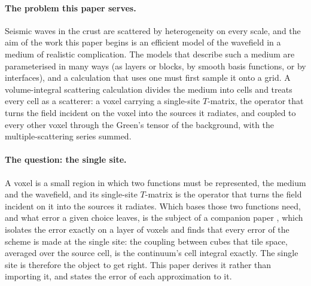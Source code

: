 \documentclass[11pt,a4paper]{article}
\begin{document}
\paragraph{The problem this paper serves.} Seismic waves in the crust are scattered by heterogeneity
on every scale, and the aim of the work this paper begins is an efficient model of the wavefield in a
medium of realistic complication. The models that describe such a medium are parameterised in many
ways (as layers or blocks, by smooth basis functions, or by interfaces), and a calculation that uses
one must first sample it onto a grid. A volume-integral scattering calculation divides the medium into
cells and treats every cell as a scatterer: a voxel carrying a single-site $T$-matrix, the operator
that turns the field incident on the voxel into the sources it radiates, and coupled to every other
voxel through the Green's tensor of the background, with the multiple-scattering series summed.


\paragraph{The question: the single site.} A voxel is a small region in which two functions must be
represented, the medium and the wavefield, and its single-site $T$-matrix is the operator that turns the
field incident on it into the sources it radiates. Which bases those two functions need, and what error a
given choice leaves, is the subject of a companion paper \citep{NestorError2026}, which isolates the error
exactly on a layer of voxels and finds that every error of the scheme is made at the single site: the
coupling between cubes that tile space, averaged over the source cell, is the continuum's cell integral
exactly. The single site is therefore the object to get right. This paper derives it rather than importing
it, and states the error of each approximation to it.
\end{document}
